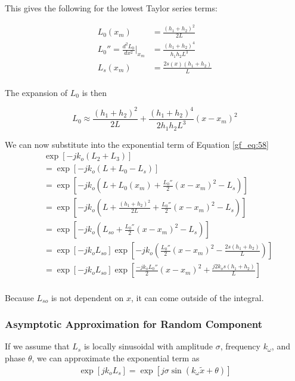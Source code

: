 \noindent This gives the following for the lowest Taylor series terms:

\begin{equation}
\begin{aligned}
L_0(x_m) &= \frac{(h_1+h_2)^2}{2L} \\
L_0''=\frac{d^2L_0}{dx^2}\bigg|_{x_m}  &= \frac{(h_1+h_2)^4}{h_1h_2L^3} \\
L_s(x_m) &= \frac{2s(x)(h_1 + h_2)}{L}\\
\end{aligned}
\label{gf_eq:65}
\end{equation}
\renewcommand{\baselinestretch}{2} \small\normalsize

\noindent The expansion of $L_0$ is then

\begin{equation}
L_0 \approx \frac{(h_1+h_2)^2}{2L} + \frac{(h_1+h_2)^4}{2h_1h_2L^3}(x-x_m)^2
\label{gf_eq:66}
\end{equation}
\renewcommand{\baselinestretch}{2} \small\normalsize

\noindent We can now substitute into the exponential term of Equation \ref{gf_eq:58}
\begin{equation}
\begin{aligned}
&\exp\left[-jk_o\left( L_2 + L_3\right) \right] \\
&= \exp\left[-jk_o\left( L+L_0-L_s\right) \right]\\
&= \exp\left[-jk_o\left( L+L_0(x_m) + \frac{L_0''}{2}(x-x_m)^2-L_s\right) \right]\\
&= \exp\left[-jk_o\left( L+\frac{(h_1+h_2)^2}{2L} + \frac{L_0''}{2}(x-x_m)^2-L_s\right)\right]\\
&=\exp\left[-jk_o\left(L_{so}+\frac{L_0''}{2}(x-x_m)^2-L_s\right)\right]\\
&=\exp\left[-jk_oL_{so}\right]\exp\left[-jk_o\left(\frac{L_0''}{2}(x-x_m)^2-\frac{2s(h_1+h_2)}{L}\right)\right]\\
&=\exp\left[-jk_oL_{so}\right]\exp\left[\frac{-jk_oL_0''}{2}(x-x_m)^2+\frac{j2k_os(h_1+h_2)}{L}\right]\\
\label{gf_eq:67}
\end{aligned}
\end{equation}
\renewcommand{\baselinestretch}{2} \small\normalsize

Because $L_{so}$ is not dependent on $x$, it can come outside of the integral.

\subsubsection{Asymptotic Approximation for Random Component}
 If we assume that $L_s$ is locally sinusoidal with amplitude $\sigma$, frequency $k_{\omega}$, and phase $\theta$, we can approximate the exponential term as 
\begin{equation}
\begin{aligned}
\exp\left[jk_oL_s\right] =\exp\left[j\sigma \sin\left(k_{\omega} \tilde{x} + \theta\right) \right]
\end{aligned}
\label{gf_eq:68}
\end{equation}
\renewcommand{\baselinestretch}{2} \small\normalsize

